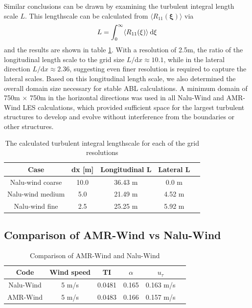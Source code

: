 Similar conclusions can be drawn by examining the turbulent integral
length scale $L$.  This lengthscale can be calculated from $\langle
R_{11}(\boldsymbol{\xi}) \rangle$ via
\begin{equation}
  L = \int_0^\infty \langle R_{11}(\xi) \rangle \: {\textrm d}\xi
\end{equation}
and the results are shown in table \ref{tab:GridStudyLscale}.  With a
resolution of 2.5m, the ratio of the longitudinal length scale to the
grid size $L/\textrm{d}x \approx 10.1$, while in the lateral direction
$L/\textrm{d}x \approx 2.36$, suggesting even finer resolution is
required to capture the lateral scales.  Based on this longitudinal
length scale, we also determined the overall domain size necessary for
stable ABL calculations.  A minimum domain of 750m $\times$ 750m in
the horizontal directions was used in all Nalu-Wind and AMR-Wind LES
calculations, which provided sufficient space for the largest
turbulent structures to develop and evolve without interference from
the boundaries or other structures.

\begin{table}[h!]
\caption{\label{tab:GridStudyLscale} The calculated turbulent integral
  lengthscale for each of the grid resolutions} \centering
\begin{tabular}{ccccc}
  \hline
  Case              & dx [m] & Longitudinal L  & Lateral L \\
  \hline
  Nalu-wind coarse  &  10.0  & 36.43 m         & 0.0 m     \\
  Nalu-wind medium  &   5.0  & 21.49 m         & 4.52 m    \\
  Nalu-wind fine    &   2.5  & 25.25 m         & 5.92 m    \\
\hline
\end{tabular}
\end{table}

\subsection{Comparison of AMR-Wind vs Nalu-Wind}

\begin{table}
\caption{\label{tab:CompareAMRvsNalu} Comparison of AMR-Wind and
  Nalu-Wind} \centering
\begin{tabular}{cccccc}
  \hline
  Code & Wind speed & TI      &  $\alpha$  &   $u_\tau$ \\ %
  \hline
  Nalu-Wind & 5 m/s &  0.0481 &  0.165     &  0.163 m/s \\ %
  AMR-Wind  & 5 m/s &  0.0483 &  0.166     &  0.157 m/s \\ %
  \hline
\end{tabular}
\end{table}

